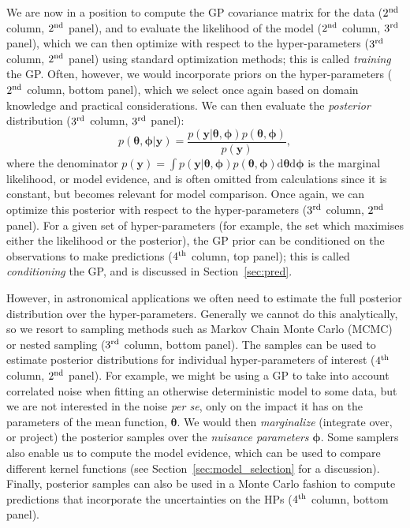 \documentclass[letterpaper]{ar-1col}
\newcommand{\hyperparams}{\ensuremath{\boldsymbol{\phi}}}
\newcommand{\meanparams}{\ensuremath{\boldsymbol{\theta}}}
\begin{document}
We are now in a position to compute the GP covariance matrix for the data ($2^{\rm nd}$ column, $2^{\rm nd}$ panel), and to evaluate the likelihood of the model ($2^{\rm nd}$ column, $3^{\rm rd}$ panel), which we can then optimize with respect to the hyper-parameters ($3^{\rm rd}$ column, $2^{\rm nd}$ panel) using standard optimization methods; this is called \emph{training} the GP. Often, however, we would incorporate priors on the hyper-parameters ($2^{\rm nd}$ column, bottom panel), which we select once again based on domain knowledge and practical considerations. We can then evaluate the \emph{posterior} distribution ($3^{\rm rd}$ column, $3^{\rm rd}$ panel):
\begin{equation}
  p(\meanparams,\hyperparams|\mathbf{y})=\frac{p(\mathbf{y}|\meanparams,\hyperparams)p(\meanparams,\hyperparams)}{p(\mathbf{y})},
\end{equation}
where the denominator $p(\mathbf{y})=\int p(\mathbf{y}|\meanparams,\hyperparams)p(\meanparams,\hyperparams) \mathrm{d}\meanparams \mathrm{d}\hyperparams$ is the marginal likelihood, or model evidence, and is often omitted from calculations since it is constant, but becomes relevant for model comparison. Once again, we can optimize this posterior with respect to the hyper-parameters ($3^{\rm rd}$ column, $2^{\rm nd}$ panel). For a given set of hyper-parameters (for example, the set which maximises either the likelihood or the posterior), the GP prior can be conditioned on the observations to make predictions ($4^{\rm th}$ column, top panel); this is called \emph{conditioning} the GP, and is discussed in Section~\ref{sec:pred}. 

However, in astronomical applications we often need to estimate the full posterior distribution over the hyper-parameters. 
Generally we cannot do this analytically, so we resort to sampling methods such as Markov Chain Monte Carlo (MCMC) or nested sampling ($3^{\rm rd}$ column, bottom panel). The samples can be used to estimate posterior distributions for individual hyper-parameters of interest ($4^{\rm th}$ column, $2^{\rm nd}$ panel). For example, we might be using a GP to take into account correlated noise when fitting an otherwise deterministic model to some data, but we are not interested in the noise \emph{per se}, only on the impact it has on the parameters of the mean function, $\meanparams$. We would then \emph{marginalize} (integrate over, or project) the posterior samples over the \emph{nuisance parameters} $\hyperparams$. Some samplers also enable us to compute the model evidence, which can be used to compare different kernel functions (see Section~\ref{sec:model_selection} for a discussion). Finally,  posterior samples can also be used in a Monte Carlo fashion to compute predictions that incorporate the uncertainties on the HPs ($4^{\rm th}$ column, bottom panel).
\end{document}
